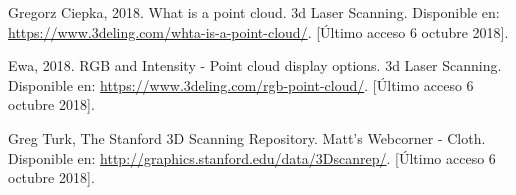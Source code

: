 \begin{thebibliography}{99}








 Gregorz Ciepka, 2018. What is a point cloud. 3d Laser Scanning. Disponible en: \url{https://www.3deling.com/whta-is-a-point-cloud/}. [Último acceso 6 octubre 2018].


 Ewa, 2018. RGB and Intensity - Point cloud display options. 3d Laser Scanning. Disponible en: \url{https://www.3deling.com/rgb-point-cloud/}. [Último acceso 6 octubre 2018].

 

 Greg Turk, The Stanford 3D Scanning Repository. Matt's Webcorner - Cloth. Disponible en: \url{http://graphics.stanford.edu/data/3Dscanrep/}. [Último acceso 6 octubre 2018].



\end{thebibliography}
